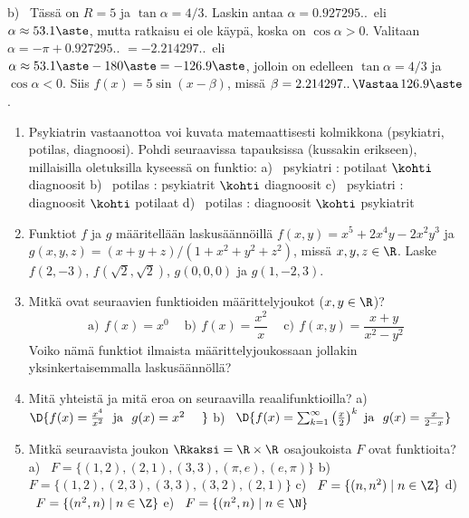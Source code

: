 b) \ Tässä on $R=5$ ja $\tan\alpha=4/3$. Laskin antaa $\alpha=0.927295..\,$ eli 
$\alpha \approx 53.1\aste$, mutta ratkaisu ei ole käypä, koska on $\cos\alpha>0$. Valitaan 
$\alpha=-\pi+0.927295..$ $=-2.214297..\,$ eli $\alpha \approx 53.1\aste-180\aste=-126.9\aste$,
jolloin on edelleen $\tan\alpha=4/3$ ja $\cos\alpha<0$. Siis $f(x)=5\sin(x-\beta)$, missä 
$\beta=2.214297..\,\Vastaa\, 126.9\aste$. \loppu

\Harj
\begin{enumerate}

\item
Psykiatrin vastaanottoa voi kuvata matemaattisesti kolmikkona (psykiatri, potilas, diagnoosi).
Pohdi seuraavissa tapauksissa (kussakin erikseen), millaisilla oletuksilla kyseessä on
funktio: \newline
a) \ psykiatri : potilaat $\kohti$ diagnoosit \newline
b) \ potilas  :  psykiatrit $\kohti$ diagnoosit \newline
c) \ psykiatri : diagnoosit $\kohti$ potilaat \newline
d) \ potilas : diagnoosit $\kohti$ psykiatrit

\item
Funktiot $f$ ja $g$ määritellään laskusäännöillä $f(x,y)=x^5+2x^4y-2x^2y^3$ ja
$g(x,y,z)=(x+y+z)/(1+x^2+y^2+z^2)$, missä $x,y,z\in\R$. Laske $f(2,-3)$, $f(\sqrt{2},\sqrt{2})$,
$g(0,0,0)$ ja $g(1,-2,3)$. 

\item 
Mitkä ovat seuraavien funktioiden määrittelyjoukot ($x,y\in\R$)? 
\[
\text{a)}\,\ f(x)=x^{0} \quad\ \text{b)}\,\ f(x)=\frac{x^2}{x} \quad\ 
\text{c)}\,\ f(x,y)=\frac{x+y}{x^2-y^2}
\]
Voiko nämä funktiot ilmaista määrittelyjoukossaan jollakin yksinkertaisemmalla laskusäännöllä?

\item
Mitä yhteistä ja mitä eroa on seuraavilla reaalifunktioilla? \newline
a) \ $\D{f(x)=\frac{x^4}{x^2}\ \ \text{ja}\ \ g(x)=x^2 \quad\ }$
b) \ $\D{f(x)=\sum_{k=1}^\infty \left(\frac{x}{2}\right)^k\ \text{ja}\ \
               g(x)=\frac{x}{2-x}}$

\item
Mitkä seuraavista joukon $\Rkaksi=\R\times\R$ osajoukoista $F$ ovat funktioita? \newline
a) \ $F=\{(1,2),(2,1),(3,3),(\pi,e),(e,\pi)\}$ \newline
b) \ $F=\{(1,2),(2,3),(3,3),(3,2),(2,1)\}$ \newline
c) \ $F=\{(n,n^2) \mid n\in\Z\}$ \newline
d) \ $F=\{(n^2,n) \mid n\in\Z\}$ \newline
e) \ $F=\{(n^2,n) \mid n\in\N\}$


\end{enumerate}
